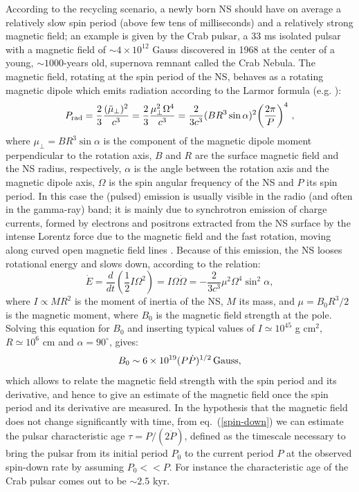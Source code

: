 \documentclass[graybox]{svmult}
\begin{document}
According to the recycling scenario, a newly born NS should have on average a relatively slow spin period (above few tens of milliseconds) and a relatively strong magnetic field; an example is given by the Crab pulsar, a 33 ms isolated pulsar with a magnetic field of $\sim 4 \times 10^{12}$ Gauss discovered in 1968 at the center of a young, $\sim 1000$-years old, supernova remnant called the Crab Nebula. The magnetic field, rotating at the spin period of the NS, behaves as a rotating magnetic dipole which emits radiation according to the Larmor formula (e.g. \cite{Jackson}):  
\begin{equation}
\label{Larmor}
P_{\rm rad} = \frac{2}{3} \frac{(\ddot{\mu}_\bot)^2}{c^3} = 
\frac{2}{3}\frac{\mu_\bot^2 \Omega^4}{c^3} = \frac{2}{3c^3}( B R^3 \sin \alpha)^2 \biggl( \frac{2\pi}{P} \biggr)^4~,
\end{equation}
where $\mu_\bot = B R^3 \sin \alpha$ is the component of the magnetic dipole moment perpendicular to the rotation axis, $B$ and $R$ are the surface magnetic field and the NS radius, respectively, $\alpha$ is the angle between the rotation axis and the magnetic dipole axis, $\Omega$ is the spin angular frequency of the NS and $P$ its spin period. 
In this case the (pulsed) emission is usually visible in the radio (and often in the gamma-ray) band; it is mainly due to synchrotron emission of charge currents, formed by electrons and positrons extracted from the NS surface by the intense Lorentz force due to the magnetic field and the fast rotation, moving along curved open magnetic field lines \cite{Jackson}. Because of this emission, the NS looses rotational energy and slows down, according to the relation:
\begin{equation}
\label{spin-down}
\dot E = \frac{d}{dt} \left(\frac{1}{2} I \Omega^2\right) = I \Omega \dot \Omega = -\frac{2}{3 c^3} \mu^2 \Omega^4 \sin^2 \alpha,
\end{equation}
where $I \propto M R^2$ is the moment of inertia of the NS, $M$ its mass, and $\mu = B_0 R^3/2$ is the magnetic moment, where $B_0$ is the magnetic field strength at the pole. Solving this equation for $B_0$ and inserting typical values of $I \simeq 10^{45}$ g cm$^2$, $R\simeq10^6$ cm and $\alpha = 90^\circ$, gives: 
\begin{equation}
\label{B0}
B_0 \sim 6 \times 10^{19} (P \dot P)^{1/2}\, \rm Gauss,
\end{equation}
which allows to relate the magnetic field strength with the spin period and its derivative, and hence to give an estimate of the magnetic field once the spin period and its derivative are measured. In the hypothesis that the magnetic field does not change significantly with time, from eq.~(\ref{spin-down}) we can estimate the pulsar characteristic age $\tau = P / (2 \dot P)$, defined as the timescale necessary to bring the pulsar from its initial period $P_0$ to the current period $P$ at the observed spin-down rate by assuming $P_0<<P$. For instance the characteristic age of the Crab pulsar comes out to be $\sim 2.5$ kyr. 
\end{document}
